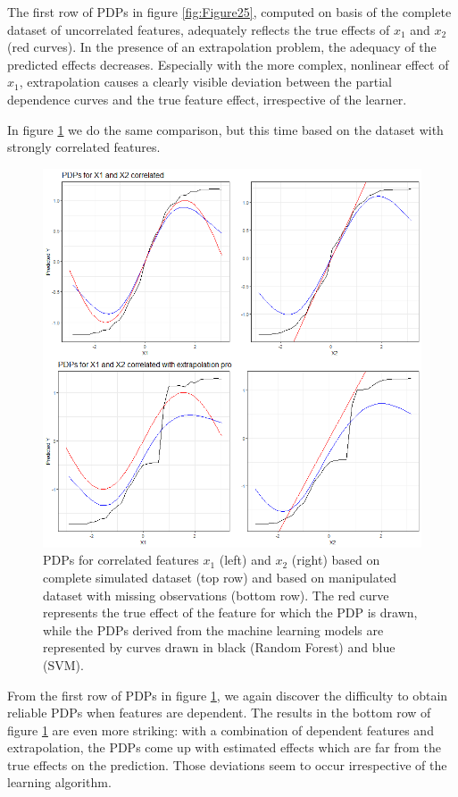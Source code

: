 \documentclass[
]{krantz}
\begin{document}
The first row of PDPs in figure \ref{fig:Figure25}, computed on basis of the complete dataset of uncorrelated features, adequately reflects the true effects of \(x_1\) and \(x_2\) (red curves). In the presence of an extrapolation problem, the adequacy of the predicted effects decreases. Especially with the more complex, nonlinear effect of \(x_1\), extrapolation causes a clearly visible deviation between the partial dependence curves and the true feature effect, irrespective of the learner.

In figure \ref{fig:Figure26} we do the same comparison, but this time based on the dataset with strongly correlated features.

\begin{figure}

\includegraphics[width=0.9\linewidth]{images/VK_PDP_26_Extrapol_cor} \hfill{}

\caption{PDPs for correlated features $x_1$ (left) and $x_2$ (right) based on complete simulated dataset (top row) and based on manipulated dataset with missing observations (bottom row). The red curve represents the true effect of the feature for which the PDP is drawn, while the PDPs derived from the machine learning models are represented by curves drawn in black (Random Forest) and blue (SVM).}\label{fig:Figure26}
\end{figure}

From the first row of PDPs in figure \ref{fig:Figure26}, we again discover the difficulty to obtain reliable PDPs when features are dependent. The results in the bottom row of figure \ref{fig:Figure26} are even more striking: with a combination of dependent features and extrapolation, the PDPs come up with estimated effects which are far from the true effects on the prediction. Those deviations seem to occur irrespective of the learning algorithm.
\end{document}
